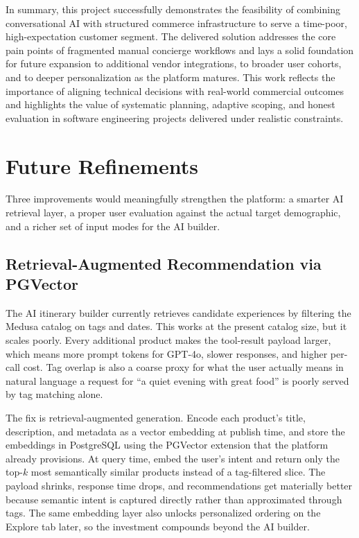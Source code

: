 \vspace{1em}

In summary, this project successfully demonstrates the feasibility of combining conversational AI with structured commerce infrastructure to serve a time-poor, high-expectation customer segment. The delivered solution addresses the core pain points of fragmented manual concierge workflows and lays a solid foundation for future expansion to additional vendor integrations, to broader user cohorts, and to deeper personalization as the platform matures. This work reflects the importance of aligning technical decisions with real-world commercial outcomes and highlights the value of systematic planning, adaptive scoping, and honest evaluation in software engineering projects delivered under realistic constraints.

\section{Future Refinements}
\label{section:Future Refinements}

Three improvements would meaningfully strengthen the platform: a smarter AI retrieval layer, a proper user evaluation against the actual target demographic, and a richer set of input modes for the AI builder.

\subsection{Retrieval-Augmented Recommendation via PGVector}

The AI itinerary builder currently retrieves candidate experiences by filtering the Medusa catalog on tags and dates. This works at the present catalog size, but it scales poorly. Every additional product makes the tool-result payload larger, which means more prompt tokens for GPT-4o, slower responses, and higher per-call cost. Tag overlap is also a coarse proxy for what the user actually means in natural language a request for ``a quiet evening with great food'' is poorly served by tag matching alone.

The fix is retrieval-augmented generation. Encode each product's title, description, and metadata as a vector embedding at publish time, and store the embeddings in PostgreSQL using the PGVector extension that the platform already provisions. At query time, embed the user's intent and return only the top-$k$ most semantically similar products instead of a tag-filtered slice. The payload shrinks, response time drops, and recommendations get materially better because semantic intent is captured directly rather than approximated through tags. The same embedding layer also unlocks personalized ordering on the Explore tab later, so the investment compounds beyond the AI builder.


